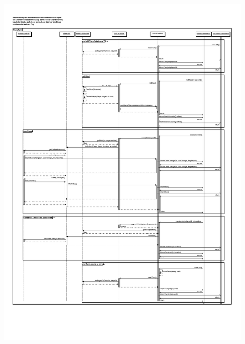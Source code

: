 \documentclass[a4paper,10pt]{article}
\begin{document}
\includegraphics[width=0.97\textwidth]{Spielzug}
\end{document}
